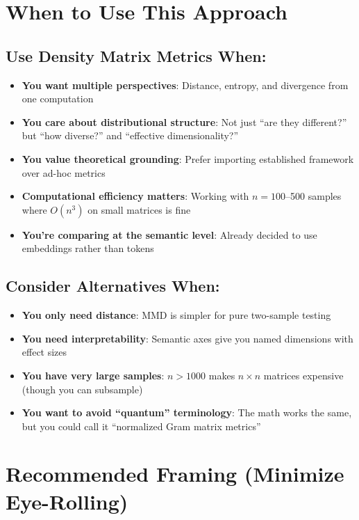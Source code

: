 \documentclass[11pt]{article}
\newcommand{\cmark}{✓}
\newcommand{\wmark}{⚠}
\begin{document}
\section{When to Use This Approach}

\subsection{Use Density Matrix Metrics When:}

\begin{itemize}
\item[\cmark] \textbf{You want multiple perspectives}: Distance, entropy, and divergence from one computation
\item[\cmark] \textbf{You care about distributional structure}: Not just ``are they different?'' but ``how diverse?'' and ``effective dimensionality?''
\item[\cmark] \textbf{You value theoretical grounding}: Prefer importing established framework over ad-hoc metrics
\item[\cmark] \textbf{Computational efficiency matters}: Working with $n=100$--500 samples where $O(n^3)$ on small matrices is fine
\item[\cmark] \textbf{You're comparing at the semantic level}: Already decided to use embeddings rather than tokens
\end{itemize}

\subsection{Consider Alternatives When:}

\begin{itemize}
\item[\wmark] \textbf{You only need distance}: MMD is simpler for pure two-sample testing
\item[\wmark] \textbf{You need interpretability}: Semantic axes give you named dimensions with effect sizes
\item[\wmark] \textbf{You have very large samples}: $n > 1000$ makes $n \times n$ matrices expensive (though you can subsample)
\item[\wmark] \textbf{You want to avoid ``quantum'' terminology}: The math works the same, but you could call it ``normalized Gram matrix metrics''
\end{itemize}

\section{Recommended Framing (Minimize Eye-Rolling)}
\end{document}
